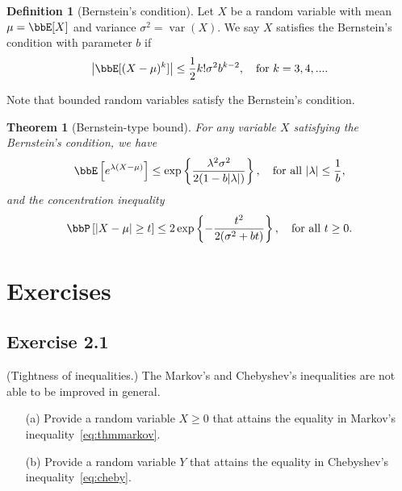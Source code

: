 \documentclass[11pt]{article}
\DeclareMathOperator{\var}{var}
\theoremstyle{plain}
\newtheorem{thm}{Theorem}[section]
\theoremstyle{definition}
\newtheorem{defn}{Definition}
\begin{document}
\begin{defn}[Bernstein's condition]
Let $X$ be a random variable with mean $\mu = \bbE[X]$ and variance $ \sigma^2 = \var(X)$. We say $X$ satisfies the Bernstein's condition with parameter $b$ if
\begin{equation}\label{eq:berncond}
	\left| \bbE [(X -\mu)^k ]\right| \leq \frac{1}{2} k! \sigma^2 b^{k-2}, \quad \text{for } k =3, 4,....
\end{equation} 
\end{defn}
Note that bounded random variables satisfy the Bernstein's condition.

\begin{thm}[Bernstein-type bound] For any variable $X$ satisfying the Bernstein's condition, we have
\begin{equation}
	\bbE\left[e^{\lambda (X-\mu)}\right] \leq \exp\left\{ \frac{\lambda^2 \sigma^2}{2(1 - b |\lambda|)} \right\},\quad \text{for all } |\lambda| \leq \frac{1}{b}, 
\end{equation}
and the concentration inequality
\begin{equation}\label{eq:thmbernconc}
	\bbP\left[|X - \mu| \geq t\right] \leq 2 \exp \left\{ -\frac{t^2}{2(\sigma^2 + bt)} \right\}, \quad \text{for all }t \geq 0.
\end{equation}
	
\end{thm}

\section{Exercises}

\subsection{Exercise 2.1} (Tightness of inequalities.) The Markov's and Chebyshev's inequalities are not able to be improved in general. 
\begin{enumerate}
	\item[(a)] Provide a random variable $X \geq 0$ that attains the equality in Markov's inequality~\eqref{eq:thmmarkov}.  
	\item[(b)] Provide a random variable $Y$ that attains the equality in Chebyshev's inequality~\eqref{eq:cheby}.  
\end{enumerate}
\end{document}
